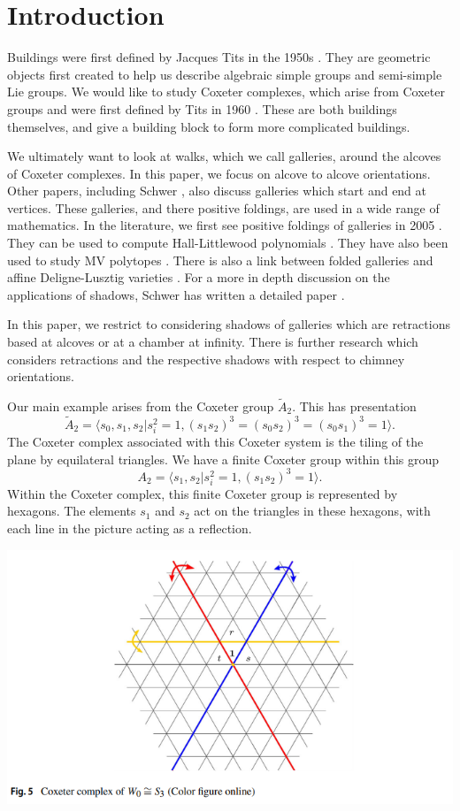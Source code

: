 \documentclass[11pt]{article}
\begin{document}
\section{Introduction}
Buildings were first defined by Jacques Tits in the 1950s \cite{TITS}. They are geometric objects first created to help us describe algebraic simple groups and semi-simple Lie groups. We would like to study Coxeter complexes, which arise from Coxeter groups and were first defined by Tits in 1960 \cite{}. These are both buildings themselves, and give a building block to form more complicated buildings. 

We ultimately want to look at walks, which we call galleries, around the alcoves of Coxeter complexes. In this paper, we focus on alcove to alcove orientations. Other papers, including Schwer \cite{WILD}, also discuss galleries which start and end at vertices. These galleries, and there positive foldings, are used in a wide range of mathematics. In the literature, we first see positive foldings of galleries in 2005 \cite{LSGAL}. They can be used to compute Hall-Littlewood polynomials \cite{HL}. They have also been used to study MV polytopes \cite{MVPOLY}. There is also a link between folded galleries and affine Deligne-Lusztig varieties \cite{DEL}. For a more in depth discussion on the applications of shadows, Schwer has written a detailed paper \cite{WILD}.

In this paper, we restrict to considering shadows of galleries which are retractions based at alcoves or at a chamber at infinity. There is further research \cite{NAQVI} which considers retractions and the respective shadows with respect to chimney orientations.

Our main example arises from the Coxeter group $\tilde{A}_2$. This has presentation
\[\tilde{A}_2=\langle s_0,s_1,s_2|s_i^2=1, (s_1s_2)^3=(s_0s_2)^3=(s_0s_1)^3=1\rangle.\]
The Coxeter complex associated with this Coxeter system is the tiling of the plane by equilateral triangles. We have a finite Coxeter group within this group
\[A_2=\langle s_1,s_2|s_i^2=1, (s_1s_2)^3=1\rangle.\]
Within the Coxeter complex, this finite Coxeter group is represented by hexagons. The elements $s_1$ and $s_2$ act on the triangles in these hexagons, with each line in the picture acting as a reflection. 

\begin{center}
    \includegraphics[scale=0.7]{Screenshot 2023-03-14 150033.png}\\
\end{center}
\end{document}
